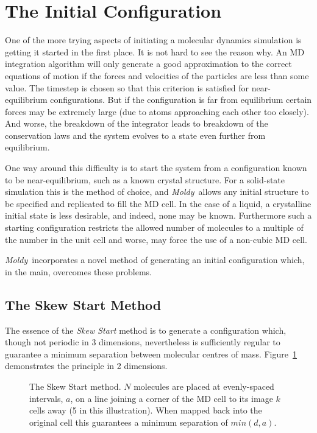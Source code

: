 \documentclass[a4paper,twoside]{report}
\newcommand{\moldy}{\emph{Moldy}}
\begin{document}
\section{The Initial Configuration}%
One of the more trying aspects of initiating a molecular dynamics
simulation is getting it started in the first place.  It is not hard
to see the reason why.  An MD integration algorithm will only generate
a good approximation to the correct equations of motion if the forces
and velocities of the particles are less than some value.  The
timestep is chosen so that this criterion is satisfied for
near-equilibrium configurations.  But if the configuration is far from
equilibrium certain forces may be extremely large (due to atoms
approaching each other too closely).  And worse, the breakdown of the
integrator leads to breakdown of the conservation laws and the
system evolves to a state even further from equilibrium.

One way around this difficulty is to start the system from a
configuration known to be near-equilibrium, such as a known crystal
structure.   For a solid-state simulation this is the method of
choice, and \moldy\ allows any initial structure to be specified and
replicated to fill the MD cell.  In the case of a liquid, a
crystalline initial state is less desirable, and indeed, none may be
known.  Furthermore such a starting configuration restricts the
allowed number of molecules to a multiple of the number in the unit
cell and worse, may force the use of a non-cubic MD cell.

\moldy\ incorporates a novel method of generating an initial
configuration which, in the main, overcomes these problems.
\subsection{The Skew Start Method}
\label{sec:skewstart}
The essence of the \emph{Skew Start} method is to generate a
configuration which, though not periodic in 3 dimensions, nevertheless
is sufficiently regular to guarantee a minimum separation between
molecular centres of mass.  Figure~\ref{fig:skewstart} demonstrates
the principle in 2 dimensions.

\begin{figure}
\setlength{\unitlength}{0.012500in}%

\caption[The Skew Start method]{The Skew Start method.  $N$ molecules
  are placed at evenly-spaced intervals, $a$, on a line joining a
  corner of the MD cell to its image $k$ cells away (5 in this
  illustration).  When mapped back into the original cell this
  guarantees a minimum separation of $min(d,a)$.}
\label{fig:skewstart}
\end{figure}
\end{document}
